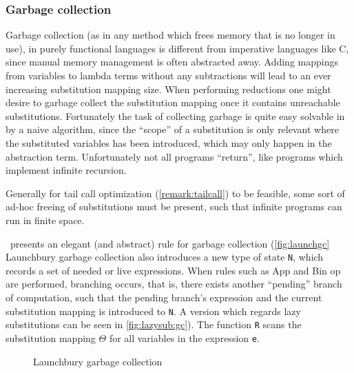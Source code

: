\documentclass[11pt,oneside,a4paper]{report}
\begin{document}
\subsubsection{Garbage collection}
Garbage collection (as in any method which frees memory that is no longer in use), in purely functional languages is different from imperative languages like C, since manual memory management is often abstracted away. 
Adding mappings from variables to lambda terms without any subtractions will lead to an ever increasing substitution mapping size.
When performing reductions one might desire to garbage collect the substitution mapping once it contains unreachable substitutions.
Fortunately the task of collecting garbage is quite easy solvable in by a naive algorithm, since the ``scope'' of a substitution is only relevant where the substituted variables has been introduced, which may only happen in the abstraction term.
Unfortunately not all programs ``return'', like programs which implement infinite recursion.
\begin{remark}
  Generally for tail call optimization (\autoref{remark:tailcall}) to be feasible, some sort of ad-hoc freeing of substitutions must be present, such that infinite programs can run in finite space.
\end{remark}
\noindent\cite{launchbury1993natural}~presents an elegant (and abstract) rule for garbage collection (\autoref{fig:launchgc}
Launchbury garbage collection also introduces a new type of state \texttt{N}, which records a set of needed or live expressions.
When rules such as App and Bin op are performed, branching occurs, that is, there exists another ``pending'' branch of computation, such that the pending branch's expression and the current substitution mapping is introduced to \texttt{N}.
A version which regards lazy substitutions can be seen in \autoref{fig:lazysub:gc}).
The function \texttt{R} scans the substitution mapping $\Theta$ for all variables in the expression \texttt{e}.
\begin{figure}[ht]
    \begin{mdframed}
          \begin{prooftree}
          \end{prooftree}   
    \end{mdframed}
    \caption{Launchbury garbage collection}
    \label{fig:launchgc}
\end{figure}
\end{document}
